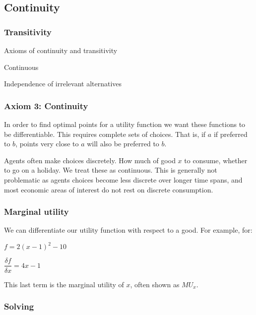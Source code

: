 
\subsection{Continuity}

\subsubsection{Transitivity}

Axioms of continuity and transitivity

Continuous

Independence of irrelevant alternatives


\subsubsection{Axiom 3: Continuity}

In order to find optimal points for a utility function we want these functions to be differentiable. This requires complete sets of choices. That is, if \(a\) if preferred to \(b\), points very close to \(a\) will also be preferred to \(b\).

Agents often make choices discretely. How much of good \(x\) to consume, whether to go on a holiday. We treat these as continuous. This is generally not problematic as agents choices become less discrete over longer time spans, and most economic areas of interest do not rest on discrete consumption.

\subsubsection{Marginal utility}

We can differentiate our utility function with respect to a good. For example, for:

\(f=2(x-1)^2-10\)

\(\dfrac{\delta f}{\delta x}=4x-1\)

This last term is the marginal utility of \(x\), often shown as \(MU_x\).


\subsubsection{Solving}

